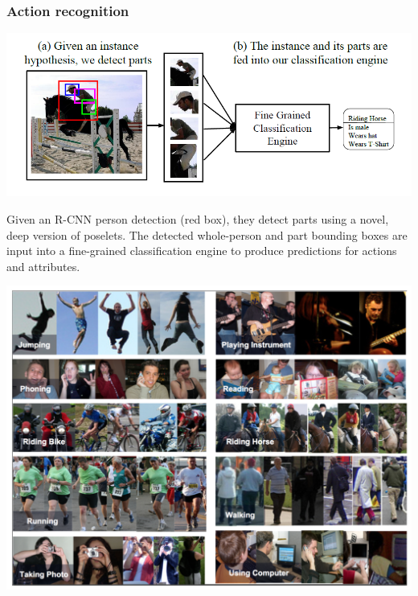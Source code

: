 \begin{frame}[allowframebreaks]
	\frametitle{Action recognition}


	\bigskip

	\begin{center}
		\includegraphics[scale=0.6]{figs/action_recognition_structure}
	\end{center}

\bigskip

Given an R-CNN person detection (red box), they detect parts using a
novel, deep version of poselets. The detected whole-person and part bounding boxes are input into a fine-grained classification engine to produce predictions for actions and attributes.

	\framebreak

	\begin{center}
		\includegraphics[scale=0.6]{figs/results_picture_action_detection}
	\end{center}

\end{frame}
